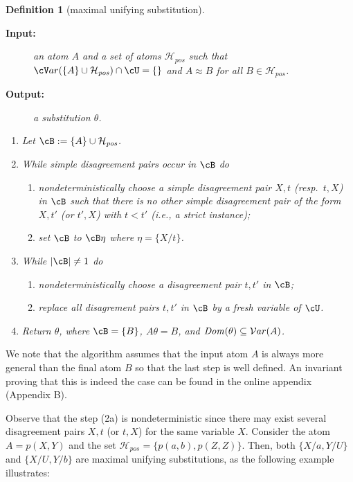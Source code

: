 \documentclass[fleqn]{tlp}
\newtheorem{definition}{Definition} \newtheorem{example}{Example} \newtheorem{lemma}{Lemma} \newtheorem{proposition}{Proposition} \newtheorem{theorem}{Theorem} \newtheorem{corollary}{Corollary}
\newcommand{\var}{{\cV}ar}
\newcommand{\Dom}{\mathit{Dom}}
\newcommand{\Hpos}{\mathcal{H}_{\mathit{pos}}}
\begin{document}
\begin{definition}[maximal unifying substitution] \label{alg1}
\begin{description}
\item[\textbf{Input:}] 
  an atom $A$ and a set of atoms $\Hpos$ such that
  $\var(\{A\}\cup\Hpos)\cap\cU=\emptyset$ and $A\approx B$ for all $B\in\Hpos$.
\item[\textbf{Output:}] a substitution $\theta$.
\end{description}

\begin{enumerate}
\item \label{algo-msa-init}
  Let $\cB:=\{A\}\cup\Hpos$.
\item \label{algo-msa-while-simple}
  While simple disagreement pairs occur in $\cB$ do
  \begin{enumerate}
  \item nondeterministically choose a simple disagreement pair $X,t$
    (resp.\ $t,X$) in $\cB$ such that there is no other simple
    disagreement pair of the form $X,t'$ (or $t',X$) with $t<t'$
    (i.e., a strict instance);
  \item \label{algo-msa-simple-pair}
    set $\cB$ to $\cB\eta$ where $\eta = \{X/t\}$.
  \end{enumerate}
\item \label{algo-msa-while-not-simple}
  While $|\cB|\neq 1$ do
  \begin{enumerate}
  \item nondeterministically choose a 
    disagreement pair $t,t'$ in $\cB$;
  \item \label{algo-msa-not-simple-pair} replace all disagrement
    pairs $t,t'$ in $\cB$ by a fresh variable of $\cU$.
  \end{enumerate}
\item \label{algo-msa-return} 
  Return $\theta$, where $\cB=\{B\}$, $A\theta = B$, and $\Dom(\theta)\subseteq\Var(A)$.
\end{enumerate}
\end{definition}
We note that the algorithm assumes that the input atom $A$ is always more
general than the final atom $B$ so that the last step is well defined. 
An invariant proving that this is indeed the case can be found in the
online appendix (Appendix B).

Observe that the step (2a) is nondeterministic since there may exist
several disagreement pairs $X,t$ (or $t,X$) for the same variable $X$.
Consider the atom $A = p(X,Y)$ and the set
$\Hpos=\{p(a,b),p(Z,Z)\}$. Then, both $\{X/a,Y/U\}$ and $\{X/U,Y/b\}$
are maximal unifying substitutions, as the following example
illustrates:
\end{document}
